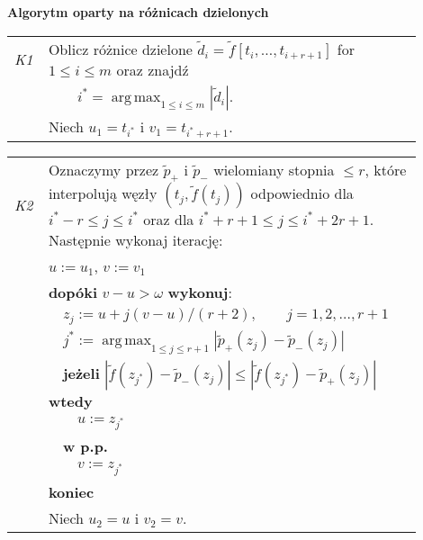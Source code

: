 \documentclass[oik, pdftex, robocza, man]{mgrwms}
\DeclareMathOperator*{\argmax}{arg\,max}
\begin{document}
    \vspace{10pt}
    \begin{table}[H]
        \begin{center}
            \textbf{Algorytm oparty na różnicach dzielonych}            
        \end{center}

        \begin{tabular}{p{0.045\linewidth} p{0.85\linewidth}}        
            \textit{K1}     & Oblicz różnice dzielone $\tilde{d}_i = \tilde{f}[t_i, \ldots, t_{i+r+1}]$ for $1 \leq i \leq m $ oraz znajdź \\
                            & \(\displaystyle \qquad i^* = \argmax_{1 \leq i \leq m }|\tilde{d}_i| \).  \\
                            & Niech $u_1 = t_{i^*}$ i $v_1 = t_{i^* + r + 1}$. \\
        \end{tabular}
    \end{table} \vspace{-20pt}
    \begin{table}[H]
        \begin{tabular}{p{0.045\linewidth} p{0.85\linewidth}}
        \textit{K2} & Oznaczymy przez $\tilde{p}_+$ i $\tilde{p}_-$ wielomiany stopnia $ \leq r$, które interpolują węzły $(t_j, \tilde{f}(t_j))$ odpowiednio dla $i^* - r \leq j \leq i^*$ oraz dla $i^* + r + 1 \leq j \leq i^* + 2r + 1$. Następnie wykonaj iterację: \\
                        & $u := u_1$, $v := v_1$ \\
                        & \textbf{dopóki} $v-u > \omega$ \textbf{wykonuj}: \\
                        & $\quad$$z_j := u + j(v-u) / (r+2), \qquad j = 1, 2, \ldots, r + 1$ \\
                        & $\quad$\(\displaystyle j^* := \argmax_{1 \leq j \leq r + 1}|\tilde{p}_{+}(z_j) - \tilde{p}_{-}(z_j)| \) \\
                        & $\quad$\textbf{jeżeli} $|\tilde{f}(z_{j^*}) - \tilde{p}_{-}(z_j)| \leq |\tilde{f}(z_{j^*}) - \tilde{p}_{+}(z_j)|$ \textbf{wtedy} \\
                        & $\quad\quad$$u:= z_{j^*}$ \\
                        & $\quad$\textbf{w p.p.} \\
                        & $\quad\quad$$v:= z_{j^*}$ \\
                        & \textbf{koniec} \\
                        & Niech $u_2 = u$ i $v_2 = v$. \\
        \end{tabular}
    \end{table} \vspace{-20pt}
\end{document}
